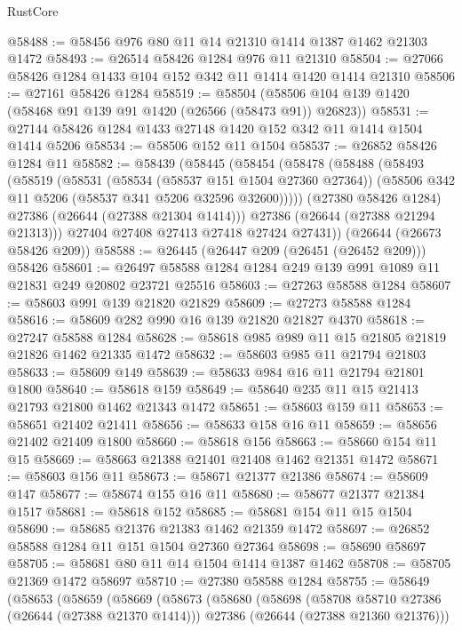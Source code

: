 \begin{lexlean}{RustCore}
\begin{coremodule}
@58488 := @58456 @976 @80 @11 @14 @21310 @1414 @1387 @1462 @21303 @1472
@58493 := @26514 @58426 @1284 @976 @11 @21310
@58504 := @27066 @58426 @1284 @1433 @104 @152 @342 @11 @1414 @1420 @1414 @21310
@58506 := @27161 @58426 @1284
@58519 := @58504 (@58506 @104 @139 @1420 (@58468 @91 @139 @91 @1420 (@26566 (@58473 @91)) @26823))
@58531 := @27144 @58426 @1284 @1433 @27148 @1420 @152 @342 @11 @1414 @1504 @1414 @5206
@58534 := @58506 @152 @11 @1504
@58537 := @26852 @58426 @1284 @11
@58582 := @58439
    (@58445
      (@58454
        (@58478
          (@58488
            (@58493
              (@58519
                (@58531
                  (@58534 (@58537 @151 @1504 @27360 @27364))
                  (@58506 @342 @11 @5206 (@58537 @341 @5206 @32596 @32600)))))
            (@27380 @58426 @1284)
            @27386
            (@26644 (@27388 @21304 @1414)))
          @27386
          (@26644 (@27388 @21294 @21313)))
        @27404
        @27408
        @27413
        @27418
        @27424
        @27431))
    (@26644 (@26673 @58426 @209))
@58588 := @26445 (@26447 @209 (@26451 (@26452 @209))) @58426
@58601 := @26497 @58588 @1284 @1284 @249 @139 @991 @1089 @11 @21831 @249 @20802 @23721 @25516
@58603 := @27263 @58588 @1284
@58607 := @58603 @991 @139 @21820 @21829
@58609 := @27273 @58588 @1284
@58616 := @58609 @282 @990 @16 @139 @21820 @21827 @4370
@58618 := @27247 @58588 @1284
@58628 := @58618 @985 @989 @11 @15 @21805 @21819 @21826 @1462 @21335 @1472
@58632 := @58603 @985 @11 @21794 @21803
@58633 := @58609 @149
@58639 := @58633 @984 @16 @11 @21794 @21801 @1800
@58640 := @58618 @159
@58649 := @58640 @235 @11 @15 @21413 @21793 @21800 @1462 @21343 @1472
@58651 := @58603 @159 @11
@58653 := @58651 @21402 @21411
@58656 := @58633 @158 @16 @11
@58659 := @58656 @21402 @21409 @1800
@58660 := @58618 @156
@58663 := @58660 @154 @11 @15
@58669 := @58663 @21388 @21401 @21408 @1462 @21351 @1472
@58671 := @58603 @156 @11
@58673 := @58671 @21377 @21386
@58674 := @58609 @147
@58677 := @58674 @155 @16 @11
@58680 := @58677 @21377 @21384 @1517
@58681 := @58618 @152
@58685 := @58681 @154 @11 @15 @1504
@58690 := @58685 @21376 @21383 @1462 @21359 @1472
@58697 := @26852 @58588 @1284 @11 @151 @1504 @27360 @27364
@58698 := @58690 @58697
@58705 := @58681 @80 @11 @14 @1504 @1414 @1387 @1462
@58708 := @58705 @21369 @1472 @58697
@58710 := @27380 @58588 @1284
@58755 := @58649
    (@58653
      (@58659
        (@58669
          (@58673
            (@58680
              (@58698
                (@58708 @58710 @27386 (@26644 (@27388 @21370 @1414)))
                @27386
                (@26644 (@27388 @21360 @21376)))

\end{coremodule}
\end{lexlean}
